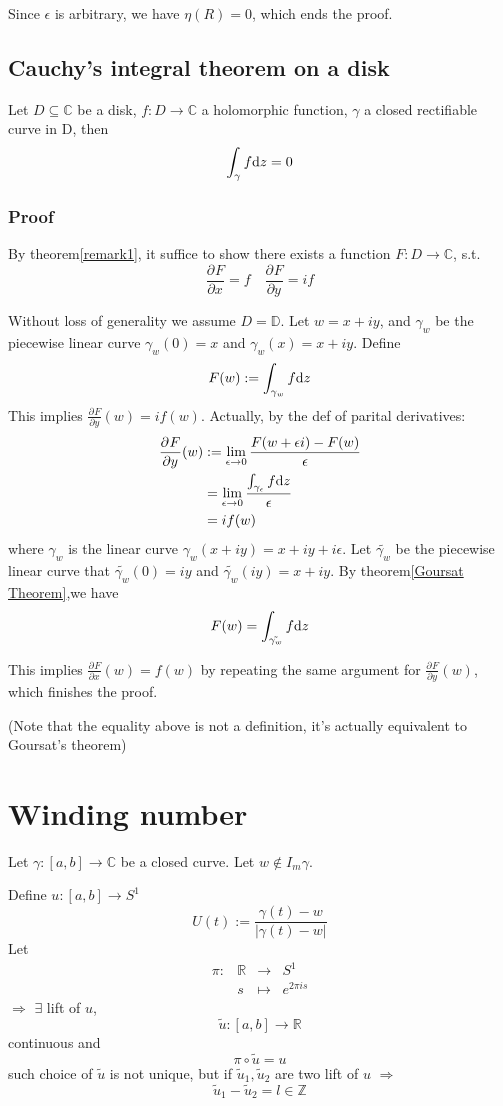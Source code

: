 \documentclass{book}
\newcommand{\abs}[1]{\left\lvert #1 \right\rvert}
\newcommand{\fpart}[3][]{\frac{\partial^{#1}#2}{\partial #3^{#1}}}
\begin{document}
Since $\epsilon$ is arbitrary, we have $\eta(R)=0$, which ends the proof.

\section{Cauchy's integral theorem on a disk}
Let $D\subseteq \mathbb C$ be a disk, $f:D\to \mathbb C$ a holomorphic function, $\gamma$ a closed rectifiable curve in D, then 
$$\int_\gamma f\text dz=0$$
\subsection*{Proof}
By theorem\ref{remark1}, it suffice to show there exists a function $F:D\to \mathbb C$, s.t. $$\fpart{F}{x}=f\quad \fpart{F}{y}=if$$

Without loss of generality we assume $D=\mathbb D$. Let $w=x+iy$, and  $\gamma_w$ be the piecewise linear curve $\gamma_w(0)= x$ and $\gamma_w(x) = x+iy$. Define
$$F(w):=\int_{\gamma_w}f\text dz$$
This implies $\fpart{F}{y}(w)=if(w)$. Actually, by the def of parital derivatives:
$$
\begin{aligned}
    \fpart{F}{y}(w) &:=\lim\limits_{\epsilon\to 0}\frac{F(w+\epsilon i)-F(w)}{\epsilon }\\
    &=\lim\limits_{\epsilon\to 0}\frac{\int_{\gamma_\epsilon}f\text dz}{\epsilon }\\
    &=if(w)
\end{aligned}
$$
where $\gamma_w$ is the linear curve $\gamma_w(x+iy)=x+iy+i\epsilon$. Let $\tilde {\gamma_w}$ be the piecewise linear curve that $\tilde {\gamma_w}(0)=iy$ and $\tilde {\gamma_w}(iy)=x+iy$. By theorem\ref{Goursat Theorem},we have $$F(w)=\int_{\tilde{\gamma_w}}f\text dz$$

This implies $\fpart{F}{x}(w)=f(w)$ by repeating the same argument for $\fpart{F}{y}(w)$, which finishes the proof.

(Note that the equality above is not a definition, it's actually equivalent to Goursat's theorem)

\chapter{Winding number}
Let $\gamma:[a,b]\to \mathbb C$ be a closed curve. Let $w\notin I_m\gamma$. 


Define $u:[a,b]\to S^1$$$U(t):=\frac{\gamma(t)-w}{\abs{\gamma(t)-w}}$$
Let $$\begin{aligned}
    \pi:&\mathbb R&\to& S^1\\ &s&\mapsto&e^{2\pi is}
\end{aligned}$$
$\Rightarrow$ $\exists$ lift of $u$, $$\tilde u:[a,b]\to \mathbb R$$continuous and $$\pi\circ \tilde u=u$$
such choice of $\tilde u$ is not unique, but if $\tilde u_1,\tilde u_2$ are two lift of $u$ $\Rightarrow$ $$\tilde u_1-\tilde u_2=l\in \mathbb Z$$
\end{document}
